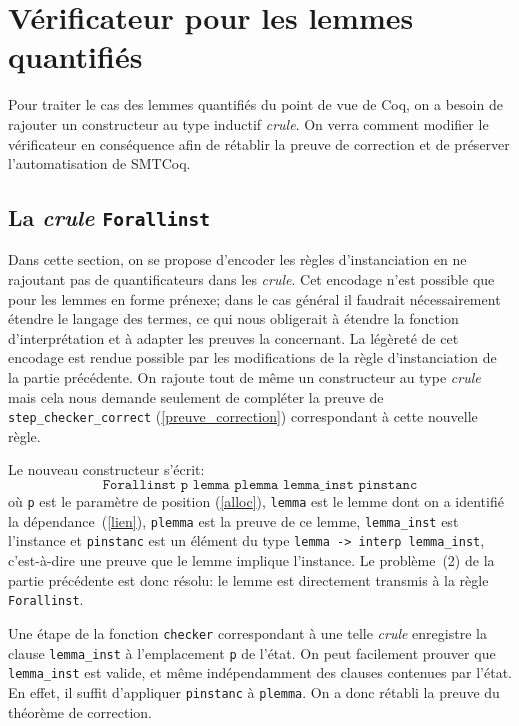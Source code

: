 \documentclass[11pt]{article}
\begin{document}
\section{Vérificateur pour les lemmes quantifiés} \label{instanciations}

Pour traiter le cas des lemmes quantifiés du point de vue de Coq, on a besoin de rajouter un constructeur au type inductif \textit{crule}. On verra comment modifier le vérificateur en conséquence afin de rétablir la preuve de correction et de préserver l'automatisation de SMTCoq.


\subsection{La \textit{crule} \texttt{Forallinst}}

Dans cette section, on se propose d'encoder les règles d'instanciation en ne rajoutant pas de quantificateurs dans les \textit{crule}. Cet encodage n'est possible que pour les lemmes en forme prénexe; dans le cas général il faudrait nécessairement étendre le langage des termes, ce qui nous obligerait à étendre la fonction d'interprétation et à adapter les preuves la concernant. La légèreté de cet encodage est rendue possible par les modifications de la règle d'instanciation de la partie précédente. On rajoute tout de même un constructeur au type \textit{crule} mais cela nous demande seulement de compléter la preuve de  \texttt{step\_checker\_correct} (\ref{preuve_correction}) correspondant à cette nouvelle règle.   \medbreak

Le nouveau constructeur s'écrit:
\[\texttt{Forallinst p lemma plemma lemma\_inst pinstanc}\]
où \texttt{p} est le para\-mètre de position (\ref{alloc}), \texttt{lemma} est le lemme dont on a identifié la dépendance~(\ref{lien}), \texttt{plemma} est la preuve de ce lemme, \texttt{lemma\_inst} est l'instance et \texttt{pinstanc} est un élément du type \texttt{lemma~->~interp lemma\_inst}, c'est-à-dire une preuve que le lemme implique l'instance. Le pro\-blème~(2) de la partie précédente est donc résolu: le lemme est directement transmis à la règle \texttt{Forallinst}. \medbreak

Une étape de la fonction \texttt{checker} correspondant à une telle \textit{crule} enregistre la clause \texttt{lemma\_inst} à l'emplacement \texttt{p} de l'état. On peut facilement prouver que \texttt{lemma\_inst} est valide, et même indépen\-damment des clauses contenues par l'état. En effet, il suffit d'appliquer \texttt{pinstanc} à \texttt{plemma}. On a donc rétabli la preuve du théorème de correction.\medbreak
\end{document}
